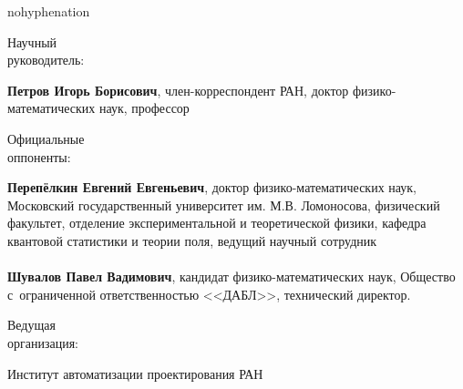 \documentclass[a4paper,14pt]{extarticle}
\numberwithin{equation}{section}
\begin{document}
    \vspace{1em}

    \begin{hyphenrules}{nohyphenation}
    \noindent
    \begin{minipage}[t]{0.26\textwidth}
        Научный\\руководитель:
    \end{minipage}
    \begin{minipage}[t]{0.72\textwidth}
        \textbf{Петров Игорь Борисович},
        член-корреспондент РАН, доктор физико-математических наук, профессор
    \end{minipage}

    \vspace{1em}

    \noindent
    \begin{minipage}[t]{0.26\textwidth}
        Официальные\\оппоненты:
    \end{minipage}
    \begin{minipage}[t]{0.72\textwidth}
        \textbf{Перепёлкин Евгений Евгеньевич},
        доктор физико-математических наук, Московский государственный университет
        им. М.В. Ломоносова, физический факультет, отделение экспериментальной и
        теоретической физики, кафедра квантовой статистики и теории поля,
        ведущий научный сотрудник
        \\
        \\
        \textbf{Шувалов Павел Вадимович},
        кандидат физико-математических наук, Общество с~ограниченной
        ответственностью <<ДАБЛ>>, технический директор.
    \end{minipage}

    \vspace{1em}

    \noindent
    \begin{minipage}[t]{0.26\textwidth}
    Ведущая\\организация:
    \end{minipage}
    \begin{minipage}[t]{0.72\textwidth}
    \leavevmode \newline
    Институт автоматизации проектирования РАН
    \end{minipage}

    \end{hyphenrules}

    \vspace{2em}
\end{document}
